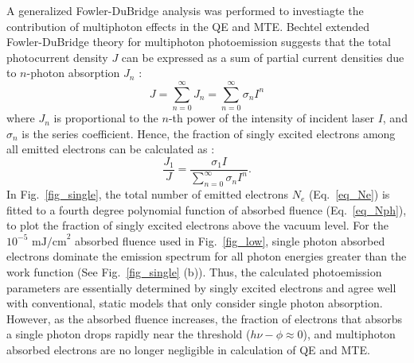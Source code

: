 A generalized Fowler-DuBridge analysis \cite{Fowler1931,DuBridge1933} was performed to investiagte the contribution of multiphoton effects in the QE and MTE. Bechtel extended Fowler-DuBridge theory for multiphoton photoemission suggests that the total photocurrent density $J$ can be expressed as a sum of partial current densities due to $n$-photon absorption $J_n$ \cite{Bechtel1977,Ferrini2009,multiphoton_musumeci}:
\begin{equation}
	J = \sum_{n = 0}^{\infty} J_n = \sum_{n = 0}^{\infty} \sigma_n I^n
\end{equation}
where $J_n$ is proportional to the $n$-th power of the intensity of incident laser $I$, and $\sigma_{n}$ is the series coefficient. Hence, the fraction of singly excited electrons among all emitted electrons can be calculated as \cite{An2018}:
\begin{equation}\label{eq_single}
	\frac{J_1}{J} = \frac{\sigma_1 I}{\sum_{n=0}^\infty \sigma_n I^n}.
\end{equation}
In Fig.~\ref{fig_single}, the total number of emitted electrons $N_e$ (Eq.~\ref{eq_Ne}) is fitted to a fourth degree polynomial function of absorbed fluence (Eq.~\ref{eq_Nph}), to plot the fraction of singly excited electrons above the vacuum level.
For the $10^{-5} \textrm{ mJ/cm}^2$ absorbed fluence used in Fig.~\ref{fig_low}, single photon absorbed electrons dominate the emission spectrum for all photon energies greater than the work function (See Fig.~\ref{fig_single} (b)). Thus, the calculated photoemission parameters are essentially determined by singly excited electrons and agree well with conventional, static models that only consider single photon absorption. However, as the absorbed fluence increases, the fraction of electrons that absorbs a single photon drops rapidly near the threshold ($h\nu - \phi \approx 0$), and multiphoton absorbed electrons are no longer negligible in calculation of QE and MTE.



